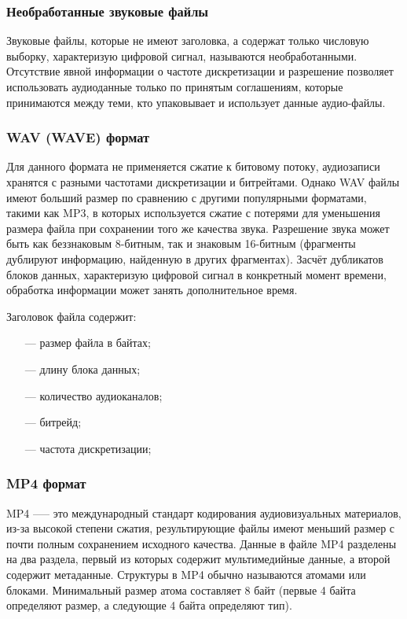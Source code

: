 	\subsubsection{Необработанные звуковые файлы}
		\par Звуковые файлы, которые не имеют заголовка, а содержат только числовую выборку, характеризую цифровой сигнал, называются необработанными.
		Отсутствие явной информации о частоте дискретизации и разрешение позволяет использовать аудиоданные только по принятым соглашениям,
		которые принимаются между теми, кто упаковывает и использует данные аудио-файлы.

	\subsubsection{WAV (WAVE) формат}
		\par Для данного формата не применяется сжатие к битовому потоку, аудиозаписи хранятся с разными частотами дискретизации и битрейтами.  
		Однако WAV \cite{wave-audio} файлы имеют больший размер по сравнению с другими популярными форматами, такими как MP3, в которых используется сжатие с потерями для уменьшения размера файла при сохранении того же качества звука.
		Разрешение звука может быть как беззнаковым 8-битным, так и знаковым 16-битным (фрагменты дублируют информацию, найденную в других фрагментах). 
		Засчёт дубликатов блоков данных, характеризую цифровой сигнал в конкретный момент времени, обработка информации может занять дополнительное время.
		
		\par Заголовок файла содержит:
		\begin{itemize}
			\item[---] размер файла в байтах;
			\item[---] длину блока данных;
			\item[---] количество аудиоканалов;
			\item[---] битрейд;
			\item[---] частота дискретизации;
		\end{itemize}


	\subsubsection{MP4 формат}
		\par MP4 \cite{mp4} —-- это международный стандарт кодирования аудиовизуальных материалов, 
		из-за высокой степени сжатия, результирующие файлы имеют меньший размер с почти полным сохранением исходного качества.
		Данные в файле MP4 разделены на два раздела, первый из которых содержит мультимедийные данные, а второй содержит метаданные.
		Структуры в MP4 обычно называются атомами или блоками. Минимальный размер атома составляет 8 байт (первые 4 байта определяют размер, а следующие 4 байта определяют тип).

